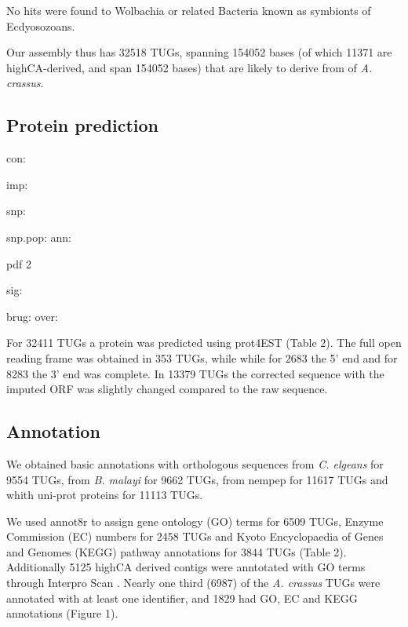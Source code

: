 \documentclass[10pt]{bmc_article}
\newenvironment{bmcformat}{\begin{raggedright}\baselineskip20pt\sloppy\setboolean{publ}{false}}{\end{raggedright}\baselineskip20pt\sloppy}
\begin{document}
\begin{bmcformat}
  No hits were found to Wolbachia or related Bacteria known as
  symbionts of Ecdyosozoans.

  Our assembly thus has 32518 TUGs,
  spanning 154052 bases
  (of which 11371 are
  highCA-derived, and span
  154052 bases) that are
  likely to derive from of \textit{A. crassus}.

\subsection*{Protein prediction}
con:

imp:

snp:




snp.pop:
ann:


\begin{Schunk}
\begin{Soutput}
pdf 
  2 
\end{Soutput}
\end{Schunk}
sig:


brug:
over:






For
32411
TUGs a protein was predicted using prot4EST
\cite{wasmuth_prot4est:_2004} (Table 2). The full open reading frame
was obtained in
353 TUGs, while
while for 2683 the
5’ end and for 8283
the 3' end was complete. In 13379 TUGs the
corrected sequence with the imputed ORF was slightly changed compared
to the raw sequence.

\subsection*{Annotation}

We obtained basic annotations with orthologous sequences from
\textit{C. elgeans} for
9554 TUGs,
from \textit{B. malayi} for
9662 TUGs,
from nempep \cite{parkinson_nembase:resource_2004, pmid21550347} for
11617
TUGs and whith uni-prot proteins for
11113 TUGs.

We used annot8r \cite{schmid_annot8r:_2008} to assign gene ontology
(GO) terms for 6509 TUGs, Enzyme Commission (EC) numbers for
2458 TUGs and Kyoto Encyclopaedia of Genes and Genomes (KEGG)
pathway annotations for 3844 TUGs (Table 2). Additionally
5125 highCA derived contigs were anntotated with GO terms
through Interpro Scan \cite{pmid11590104}. Nearly one third
(6987) of the \textit{A. crassus} TUGs were
annotated with at least one identifier, and 1829 had
GO, EC and KEGG annotations (Figure 1).


\end{bmcformat}
\end{document}

